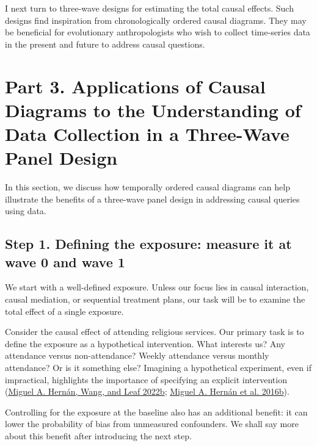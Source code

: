 \documentclass[
  singlecolumn]{report}
\begin{document}
I next turn to three-wave designs for estimating the total causal
effects. Such designs find inspiration from chronologically ordered
causal diagrams. They may be beneficial for evolutionary anthropologists
who wish to collect time-series data in the present and future to
address causal questions.

\hypertarget{part-3.-applications-of-causal-diagrams-to-the-understanding-of-data-collection-in-a-three-wave-panel-design}{%
\section{Part 3. Applications of Causal Diagrams to the Understanding of
Data Collection in a Three-Wave Panel
Design}\label{part-3.-applications-of-causal-diagrams-to-the-understanding-of-data-collection-in-a-three-wave-panel-design}}

In this section, we discuss how temporally ordered causal diagrams can
help illustrate the benefits of a three-wave panel design in addressing
causal queries using data.

\hypertarget{step-1.-defining-the-exposure-measure-it-at-wave-0-and-wave-1}{%
\subsection{Step 1. Defining the exposure: measure it at wave 0 and wave
1}\label{step-1.-defining-the-exposure-measure-it-at-wave-0-and-wave-1}}

We start with a well-defined exposure. Unless our focus lies in causal
interaction, causal mediation, or sequential treatment plans, our task
will be to examine the total effect of a single exposure.

Consider the causal effect of attending religious services. Our primary
task is to define the exposure as a hypothetical intervention. What
interests us? Any attendance versus non-attendance? Weekly attendance
versus monthly attendance? Or is it something else? Imagining a
hypothetical experiment, even if impractical, highlights the importance
of specifying an explicit intervention
(\protect\hyperlink{ref-hernuxe1n2022}{Miguel A. Hernán, Wang, and Leaf
2022b}; \protect\hyperlink{ref-hernuxe1n2016a}{Miguel A. Hernán et al.
2016b}).

Controlling for the exposure at the baseline also has an additional
benefit: it can lower the probability of bias from unmeasured
confounders. We shall say more about this benefit after introducing the
next step.
\end{document}
